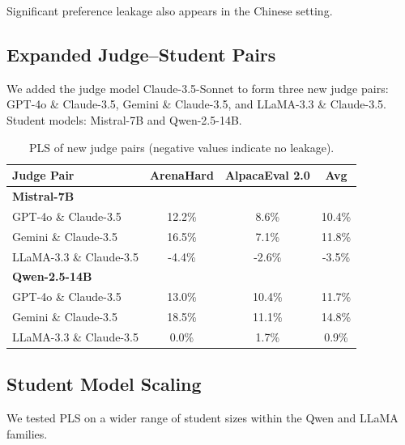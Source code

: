 \documentclass{article} %
\begin{document}
Significant preference leakage also appears in the Chinese setting.

\subsection{Expanded Judge–Student Pairs}
\label{app:expanded_pairs}
We added the judge model Claude-3.5-Sonnet to form three new judge pairs: GPT-4o \& Claude-3.5, Gemini \& Claude-3.5, and LLaMA-3.3 \& Claude-3.5.  
Student models: Mistral-7B and Qwen-2.5-14B.

\begin{table}[h]
\centering
\caption{PLS of new judge pairs (negative values indicate no leakage).}
\small
\begin{tabular}{lccc}
\toprule
Judge Pair & ArenaHard & AlpacaEval 2.0 & Avg \\
\midrule
\multicolumn{4}{l}{\textbf{Mistral-7B}} \\
GPT-4o \& Claude-3.5 & 12.2\% & 8.6\% & 10.4\% \\
Gemini \& Claude-3.5 & 16.5\% & 7.1\% & 11.8\% \\
LLaMA-3.3 \& Claude-3.5 & -4.4\% & -2.6\% & -3.5\% \\
\multicolumn{4}{l}{\textbf{Qwen-2.5-14B}} \\
GPT-4o \& Claude-3.5 & 13.0\% & 10.4\% & 11.7\% \\
Gemini \& Claude-3.5 & 18.5\% & 11.1\% & 14.8\% \\
LLaMA-3.3 \& Claude-3.5 & 0.0\% & 1.7\% & 0.9\% \\
\bottomrule
\end{tabular}
\end{table}

\subsection{Student Model Scaling}
\label{app:student_scaling}
We tested PLS on a wider range of student sizes within the Qwen and LLaMA families.
\end{document}
